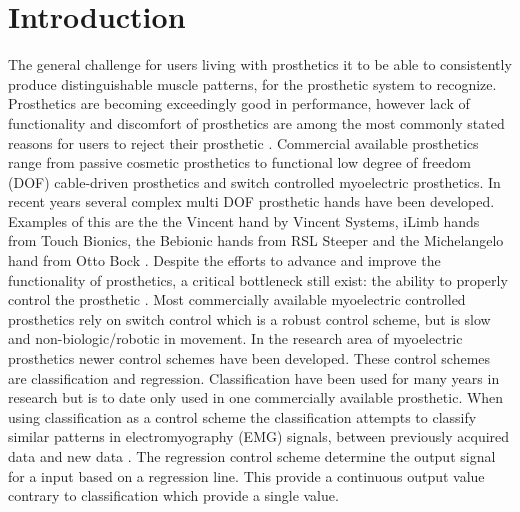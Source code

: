 
\section{Introduction}			%


%


The general challenge for users living with prosthetics it to be able to consistently produce distinguishable muscle patterns, for the prosthetic system to recognize. \cite{Powell2014} Prosthetics are becoming exceedingly good in performance, however lack of functionality and discomfort of prosthetics are among the most commonly stated reasons for users to reject their prosthetic \cite{Reiber2010}. Commercial available prosthetics range from passive cosmetic prosthetics to functional low degree of freedom (DOF) cable-driven prosthetics and switch controlled myoelectric prosthetics. 
In recent years several complex multi DOF prosthetic hands have been developed. Examples of this are the the Vincent hand by Vincent Systems, iLimb hands from Touch Bionics, the Bebionic hands from RSL Steeper and the Michelangelo hand from Otto Bock \cite{Belter2013}. Despite the efforts to advance and improve the functionality of prosthetics, a critical bottleneck still exist: the ability to properly control the prosthetic \cite{Hwang2017}. Most commercially available myoelectric controlled prosthetics rely on switch control which is a robust control scheme, but is slow and non-biologic/robotic in movement. In the research area of myoelectric prosthetics newer control schemes have been developed.%
These control schemes are classification and regression. Classification have been used for many years in research but is to date only used in one commercially available prosthetic. When using classification as a control scheme the classification attempts to classify similar patterns in electromyography (EMG) signals, between previously acquired data and new data \cite{Mendez2017}. The regression control scheme determine the output signal for a input based on a regression line. This provide a continuous output value contrary to classification which provide a single value. \cite{Hahne2014} 
